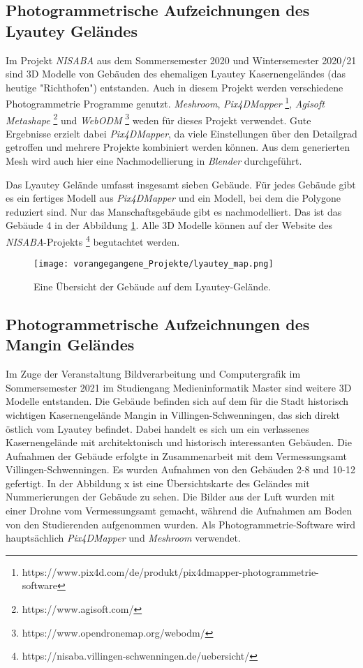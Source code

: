 \subsection{Photogrammetrische Aufzeichnungen des Lyautey Geländes}
Im Projekt \textit{NISABA} \cite{nisaba2021} aus dem Sommersemester 2020 und Wintersemester 2020/21 sind 3D Modelle von Gebäuden des ehemaligen Lyautey Kasernengeländes (das heutige "Richthofen") entstanden. Auch in diesem Projekt werden verschiedene Photogrammetrie Programme genutzt. \textit{Meshroom}, \textit{Pix4DMapper} \footnote{https://www.pix4d.com/de/produkt/pix4dmapper-photogrammetrie-software}, \textit{Agisoft Metashape} \footnote{https://www.agisoft.com/} und \textit{WebODM} \footnote{https://www.opendronemap.org/webodm/} weden für dieses Projekt verwendet. Gute Ergebnisse erzielt dabei \textit{Pix4DMapper}, da viele Einstellungen über den Detailgrad getroffen und mehrere Projekte kombiniert werden können. Aus dem generierten Mesh wird auch hier eine Nachmodellierung in \textit{Blender} durchgeführt.

Das Lyautey Gelände umfasst insgesamt sieben Gebäude. Für jedes Gebäude gibt es ein fertiges Modell aus \textit{Pix4DMapper} und ein Modell, bei dem die Polygone reduziert sind. Nur das Manschaftsgebäude gibt es nachmodelliert. Das ist das Gebäude 4 in der Abbildung \ref{fig:lyautey-map}. Alle 3D Modelle können auf der Website des \textit{NISABA}-Projekts \footnote{https://nisaba.villingen-schwenningen.de/uebersicht/} begutachtet werden. 

\begin{figure}[h]
    \centering
    \texttt{[image: vorangegangene\_Projekte/lyautey\_map.png]}
    \caption{Eine Übersicht der Gebäude auf dem Lyautey-Gelände.}
    \label{fig:lyautey-map}
\end{figure}

\subsection{Photogrammetrische Aufzeichnungen des Mangin Geländes}
Im Zuge der Veranstaltung Bildverarbeitung und Computergrafik im Sommersemester 2021 im Studiengang Medieninformatik Master sind weitere 3D Modelle entstanden\cite{kusch2021}. Die Gebäude befinden sich auf dem für die Stadt historisch wichtigen Kasernengelände Mangin in Villingen-Schwenningen, das sich direkt östlich vom Lyautey befindet. Dabei handelt es sich um ein verlassenes Kasernengelände mit architektonisch und historisch interessanten Gebäuden. Die Aufnahmen der Gebäude erfolgte in Zusammenarbeit mit dem Vermessungsamt Villingen-Schwenningen. Es wurden Aufnahmen von den Gebäuden 2-8 und 10-12 gefertigt. In der Abbildung x ist eine Übersichtskarte des Geländes mit Nummerierungen der Gebäude zu sehen.  Die Bilder aus der Luft wurden mit einer Drohne vom Vermessungsamt gemacht, während die Aufnahmen am Boden von den Studierenden aufgenommen wurden. Als Photogrammetrie-Software wird hauptsächlich \textit{Pix4DMapper} und \textit{Meshroom} verwendet. 

